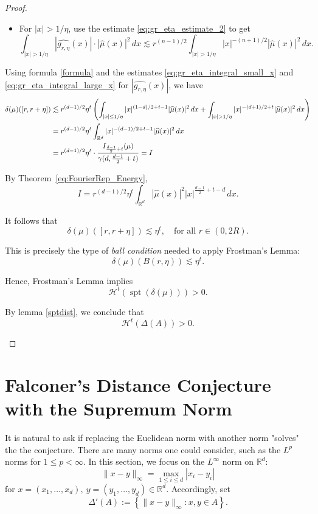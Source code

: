 \documentclass[12pt,a4paper]{report}
\theoremstyle{definition}
\begin{document}
\begin{proof}
\begin{itemize}
\begin{itemize}
\item For \( |x| > 1/\eta \), use the estimate \eqref{eq:gr_eta_estimate_2} to get
  \begin{equation}
  \int_{|x| > 1/\eta} |\widehat{g_{r,\eta}}(x)| \cdot |\widehat{\mu}(x)|^2 \, dx
  \lesssim r^{(n-1)/2} \int_{|x| > 1/\eta} |x|^{-(n+1)/2} |\widehat{\mu}(x)|^2 \, dx.
  \label{eq:gr_eta_integral_large_x}
  \end{equation}
\end{itemize}

Using formula \eqref{formula} and the estimates \eqref{eq:gr_eta_integral_small_x}  and  \eqref{eq:gr_eta_integral_large_x} for \( |\widehat{g_{r,\eta}}(x)| \), we have
\begin{align}
\delta(\mu)([r, r + \eta])
&\lesssim r^{(d-1)/2} \eta^t \left(
\int_{|x| \leq 1/\eta} |x|^{(1-d)/2 + t - 1} |\widehat{\mu}(x)|^2 \, dx
+ \int_{|x| > 1/\eta} |x|^{-(d+1)/2 + t} |\widehat{\mu}(x)|^2 \, dx \right) \notag \\
&= r^{(d-1)/2} \eta^t \int_{\mathbb{R}^d} |x|^{-(d-1)/2 + t - 1} |\widehat{\mu}(x)|^2 \, dx \notag \\
&= r^{(d-1)/2} \eta^t \cdot \frac{I_{\frac{d-1}{2} + t}(\mu)}{\gamma(d, \frac{d-1}{2} + t)} = I
\end{align}

By Theorem~\ref{eq:FourierRep_Energy},
\begin{equation}
I = r^{(d-1)/2} \eta^t \int_{\mathbb{R}^d} |\widehat{\mu}(x)|^2 |x|^{\frac{d-1}{2} + t - d} \, dx.
\label{eq:delta_mu_as_integral}
\end{equation}

It follows that
\[
\delta(\mu)([r, r + \eta]) \lesssim \eta^t, \quad \text{for all } r \in (0, 2R).
\]

This is precisely the type of \textit{ball condition} needed to apply Frostman's Lemma:
\[
\delta(\mu)(B(r, \eta)) \lesssim \eta^t.
\]

\noindent
Hence, Frostman's Lemma implies
\[
\mathcal{H}^t(\operatorname{spt}(\delta(\mu))) > 0.
\]

\noindent
By lemma \ref{sptdist}, we conclude that
\[
\mathcal{H}^t(\Delta(A)) > 0.
\]
\end{itemize}
\end{proof}

\section{Falconer's Distance Conjecture with the Supremum Norm}
It is natural to ask if replacing the Euclidean norm with another norm "solves" the the conjecture. There are many norms one could consider, such as the \( L^p \) norms for \( 1 \leq p < \infty \). In this section, we focus on the \( L^\infty \) norm on \( \mathbb{R}^d \):
\[
\|x - y\|_\infty = \max_{1 \leq i \leq d} |x_i - y_i|
\]
for $x = (x_1, \dots, x_d),\ y = (y_1, \dots, y_d) \in \mathbb{R}^d$.
Accordingly, set
\[
\Delta'(A) := \left\{ \|x - y\|_\infty : x, y \in A \right\}.
\]
\end{document}
